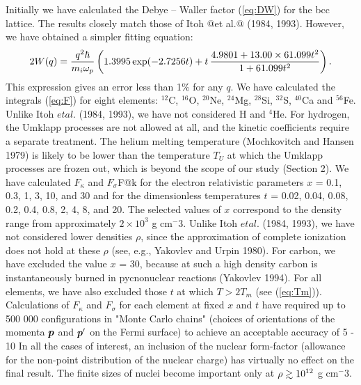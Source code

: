 Initially we have calculated the Debye -- Waller factor (\ref{eq:DW}) 
for the bcc lattice.
The results closely match those of Itoh @et al.@ (1984, 1993).
However, we have obtained a simpler fitting equation:
%
\begin{equation}
    2W(q)  =  {q^2 \hbar \over m_i \omega_p}
              \left(1.3995 \exp(-2.7256t)+t \,
              { 4.9801+13.00 \times 61.099 t^2 \over 1+61.099t^2} \right).
\label{eq:DWexactfit}
\end{equation}
%
This expression gives an error less than 1\% for any $q$.
We have calculated the integrals (\ref{eq:F})
for eight elements: $^{12}$C, $^{16}$O, $^{20}$Ne,
$^{24}$Mg, $^{28}$Si, $^{32}$S, $^{40}$Ca and $^{56}$Fe.
Unlike Itoh $et al.$ (1984, 1993), we have not considered
H and $^4$He. For hydrogen, the Umklapp processes are not allowed
at all, and the kinetic coefficients require a separate treatment. 
The helium melting temperature (Mochkovitch and Hansen 1979) 
is likely to be lower than the temperature $T_U$ at which 
the Umklapp processes are frozen out, which is
beyond the scope of our study (Section 2). We have calculated
$F_\kappa$ and $F_\sigma$F@k for the electron
relativistic parameters $x$ = 0.1, 0.3, 1, 3, 10, and 30
and for the dimensionless temperatures $t$ =
0.02, 0.04, 0.08, 0.2, 0.4, 0.8, 2, 4, 8, and 20. The selected
values of $x$ correspond to the density range from approximately 
$2 \times 10^3$ g cm$^-3$. Unlike Itoh $et al.$ (1984, 1993), we
have not considered lower densities $\rho$, since the approximation of
complete ionization does not hold at these $\rho$ (see, e.g.,
Yakovlev and Urpin 1980). For carbon, we have excluded
the value $x$ = 30, because at such a high density carbon 
is instantaneously burned in pycnonuclear
reactions (Yakovlev 1994). For all elements, we have also
excluded those $t$ at which $T > 2T_m$ (see (\ref{eq:Tm})).
Calculations of $F_\kappa$ and $F_\sigma$ for each element at fixed $x$ and
$t$ have required up to 500 000 configurations in "Monte Carlo chains"
(choices of orientations of the momenta $\mbox{\boldmath $p$}$ and $\mbox{\boldmath $p$}'$ on 
the Fermi surface) to achieve an acceptable accuracy of 5 - 10%
In all the cases of interest, an inclusion of the nuclear 
form-factor (allowance for the non-point distribution 
of the nuclear charge) has virtually no effect on the final
result. The finite sizes of nuclei become important only at
$\rho \ga 10^{12}$ g cm$^-3$.

